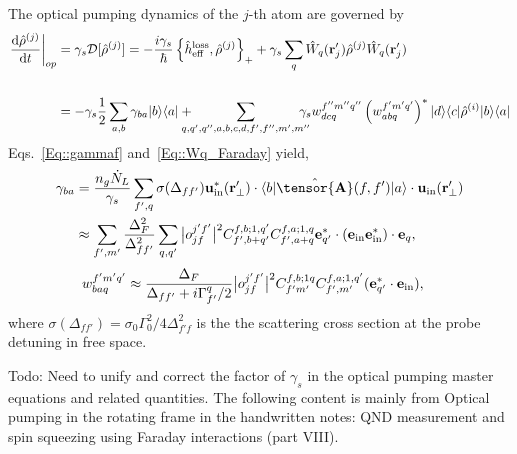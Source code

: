 \documentclass[preprint,aps,pra,onecolumn,superscriptaddress]{revtex4-1} %
\newcommand{\dt}[1]{\frac{{\mathrm d} {#1}}{{\mathrm d}t}}
\def\br{\mathbf{r}}
\def\bra#1{\langle{#1}\rvert}%
\def\ket#1{\lvert{#1}\rangle}%
\newcommand{\mbf}[1]{\mathbf{#1}}
\newcommand{\inp}{{\rm in}}
\newcommand{\comment}[1]{{\color{Maroon} #1}}
\begin{document}
\begin{appendix}
The optical pumping dynamics of the $ j $-th atom are governed by 
\begin{align}
\left.\dt{\hat{\rho}^{(j)}}\right|_{op} &= \gamma_s\mathcal{D}[\hat{\rho}^{(j)}]=-\frac{i\gamma_s}{\hbar}\left\{\hat{h}^{\rm loss}_{\rm eff},\hat{\rho}^{(j)} \right\}_+ + \gamma_s\sum_{q}\hat{W}_q(\br'_j)\hat{\rho}^{(j)}\hat{W}_q(\br'_j)\\
\\
&=-\gamma_s\frac{1}{2}\sum_{a,b}\gamma_{ba}\ket{b}\bra{a}+
\!\!\!\!\!\!\sum_{q,q',q'',a,b,c,d,f',f'',m',m''}\!\!\!\!\!\! \gamma_sw_{dcq}^{f''m''q''}\left(w_{abq}^{f'm'q'}\right)^*\ket{d}\bra{c}\hat{\rho}^{(i)}\ket{b}\bra{a}
\end{align}
Eqs.~\eqref{Eq::gammaf} and~\eqref{Eq::Wq_Faraday} yield,
\begin{subequations}
	\begin{align}
		\gamma_{ba} 
		&=\frac{n_g\dot{N}_L}{\gamma_s}  \sum_{f',q} \sigma (\Delta_{ff'} ) \mathbf{u}^*_\inp(\br'_\perp)\cdot \bra{b} \hat{\tensor{\mbf{A}}}(f,f') \ket{a}  \cdot \mathbf{u}_\inp(\br'_\perp)\\
		&\approx  \sum_{f',m'} \frac{\Delta_{F}^2}{\Delta_{ff'}^2}\sum_{q,q'} \big| o_{jf}^{j'f'} \big|^2C_{f',b+q'}^{f,b;1, q'}C_{f',a+q}^{f,a;1, q} \mathbf{e}_{q'}^* \cdot (\mathbf{e}_{\rm in}\mathbf{e}_{\rm in}^* )\cdot \mathbf{e}_q,
	\end{align}
\end{subequations}
	\begin{align}
		w_{baq}^{f'm'q'}
		&\approx  \frac{\Delta_{F}}{\Delta_{ff'}+i\Gamma_{f'}^q/2} \big| o_{jf}^{j'f'}  \big|^2 C_{f'm'}^{f,b;1 q}C_{f',m'}^{f,a;1,q'} (\mathbf{e}_{q'}^* \cdot \mathbf{e}_{\rm in}),
	\end{align}
where $ \sigma (\Delta_{ff'} )  = \sigma_0 \Gamma_0^2/4\Delta^2_{f' f}$ is the the scattering cross section at the probe detuning in free space. 

\comment{Todo: Need to unify and correct the factor of $\gamma_s$ in the optical pumping master equations and related quantities. The following content is mainly from Optical pumping in the rotating frame in the handwritten notes: QND measurement and spin squeezing using Faraday interactions (part VIII).}


\end{appendix}
\end{document}
